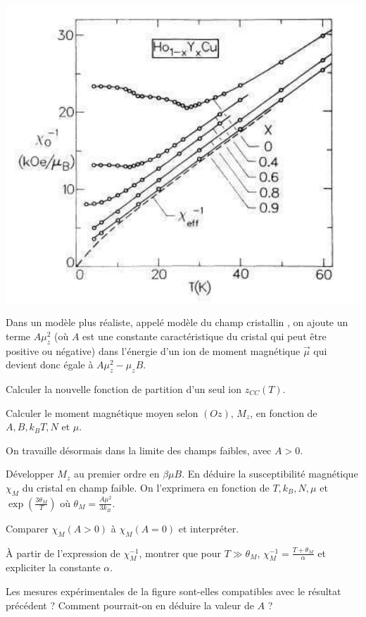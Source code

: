 \begin{center}
\includegraphics[scale=0.4]{../Fig/SusceptibiliteMagnetique.png}
\end{center}


Dans un modèle plus réaliste, appelé modèle du \og champ cristallin \fg , on ajoute un terme  $A \mu_z^2$ (où $A$ est une constante caractéristique du cristal  qui peut être positive ou négative) dans l'énergie d'un ion de moment magnétique $\Vec{\mu}$ qui devient donc égale à  $A \mu_z^2 -\mu_z B$.

\question Calculer la nouvelle fonction de partition d'un seul ion $z_{CC}(T)$.

\question Calculer le moment magnétique moyen selon $(Oz)$, $M_z$, en fonction de $A, B, k_B T, N$ et $\mu$.

On travaille désormais dans la limite des champs faibles, avec $A>0$.

\question Développer $M_z$ au premier ordre en $\beta \mu B$. En déduire la susceptibilité magnétique
$\chi_M$ du cristal en champ faible. On l'exprimera en fonction de $T, k_B, N, \mu$ et $\exp(\frac{3 \theta_M}{T})$ où $\theta_M=\frac{A \mu^2}{3 k_B}$.

\question Comparer $\chi_M(A >0)$ à $\chi_M(A=0)$ et interpréter.

\question 
\`A partir de l'expression de $\chi_M^{-1}$, montrer que pour $T \gg \theta_M$, $\chi_M^{-1}=\frac{T+\theta_M }{\alpha}$ et expliciter la constante $\alpha$.

\question Les mesures expérimentales de la figure sont-elles compatibles avec le résultat précédent ? Comment pourrait-on en déduire la valeur de $A$ ?

